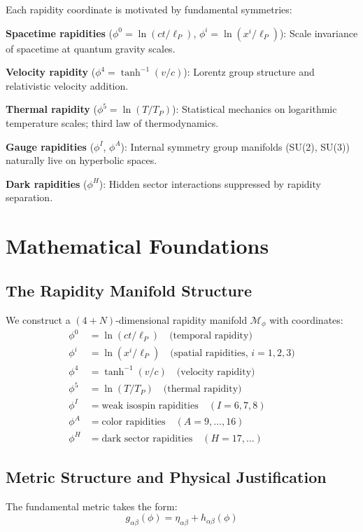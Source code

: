 \documentclass[12pt,a4paper]{article}
\begin{document}
Each rapidity coordinate is motivated by fundamental symmetries:

\textbf{Spacetime rapidities} ($\phi^0 = \ln(ct/\ell_P)$, $\phi^i = \ln(x^i/\ell_P)$): Scale invariance of spacetime at quantum gravity scales.

\textbf{Velocity rapidity} ($\phi^4 = \tanh^{-1}(v/c)$): Lorentz group structure and relativistic velocity addition.

\textbf{Thermal rapidity} ($\phi^5 = \ln(T/T_P)$): Statistical mechanics on logarithmic temperature scales; third law of thermodynamics.

\textbf{Gauge rapidities} ($\phi^I$, $\phi^A$): Internal symmetry group manifolds (SU(2), SU(3)) naturally live on hyperbolic spaces.

\textbf{Dark rapidities} ($\phi^H$): Hidden sector interactions suppressed by rapidity separation.

\section{Mathematical Foundations}

\subsection{The Rapidity Manifold Structure}

We construct a $(4+N)$-dimensional rapidity manifold $\mathcal{M}_\phi$ with coordinates:
\begin{align}
\phi^0 &= \ln(ct/\ell_P) \quad \text{(temporal rapidity)} \\
\phi^i &= \ln(x^i/\ell_P) \quad \text{(spatial rapidities, } i=1,2,3\text{)} \\
\phi^4 &= \tanh^{-1}(v/c) \quad \text{(velocity rapidity)} \\
\phi^5 &= \ln(T/T_P) \quad \text{(thermal rapidity)} \\
\phi^I &= \text{weak isospin rapidities} \quad (I=6,7,8) \\
\phi^A &= \text{color rapidities} \quad (A=9,\ldots,16) \\
\phi^H &= \text{dark sector rapidities} \quad (H=17,\ldots)
\end{align}

\subsection{Metric Structure and Physical Justification}

The fundamental metric takes the form:
\begin{equation}
g_{\alpha\beta}(\phi) = \eta_{\alpha\beta} + h_{\alpha\beta}(\phi)
\end{equation}
\end{document}
